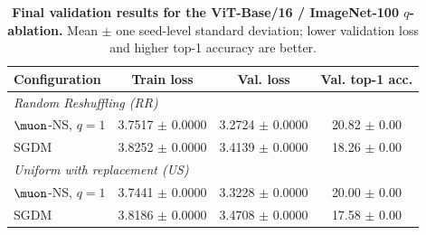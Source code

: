 \begin{table}[t]
\centering
\small
\caption{\textbf{Final validation results for the ViT-Base/16 / ImageNet-100 $q$-ablation.} Mean $\pm$ one seed-level standard deviation; lower validation loss and higher top-1 accuracy are better.}
\label{tab:q-ablation-vitb16-imagenet100-final}
\begin{tabular}{lccc}
\toprule
Configuration & Train loss & Val. loss & Val. top-1 acc. \\
\midrule
\multicolumn{4}{l}{\emph{Random Reshuffling (RR)}} \\
\quad $\muon$-NS, $q=1$ & 3.7517 $\pm$ 0.0000 & 3.2724 $\pm$ 0.0000 & 20.82 $\pm$ 0.00 \\
\quad \textsc{SGDM} & 3.8252 $\pm$ 0.0000 & 3.4139 $\pm$ 0.0000 & 18.26 $\pm$ 0.00 \\
\midrule
\multicolumn{4}{l}{\emph{Uniform with replacement (US)}} \\
\quad $\muon$-NS, $q=1$ & 3.7441 $\pm$ 0.0000 & 3.3228 $\pm$ 0.0000 & 20.00 $\pm$ 0.00 \\
\quad \textsc{SGDM} & 3.8186 $\pm$ 0.0000 & 3.4708 $\pm$ 0.0000 & 17.58 $\pm$ 0.00 \\
\bottomrule
\end{tabular}
\end{table}
